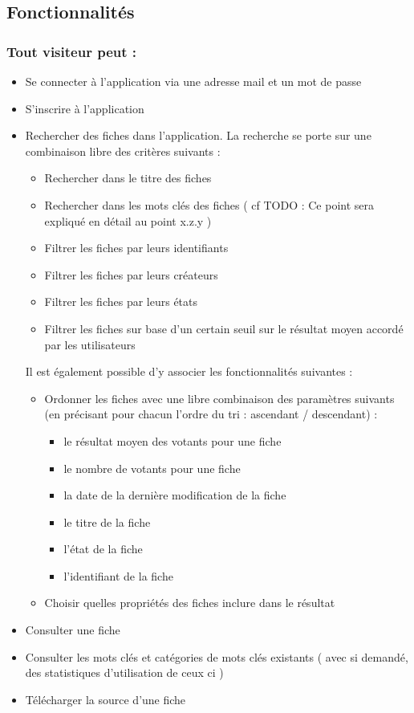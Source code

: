 \pagebreak

\subsection*{Fonctionnalités}

\subsubsection*{Tout visiteur peut : }

\begin{itemize}
    \item Se connecter à l'application via une adresse mail et un mot de passe
    \item S'inscrire à l'application
    \item Rechercher des fiches dans l'application. La recherche se porte sur une combinaison libre des critères suivants : 
    \begin{itemize}
        \item Rechercher dans le titre des fiches
        \item Rechercher dans les mots clés des fiches ( cf TODO : Ce point sera expliqué en détail au point x.z.y )
        \item Filtrer les fiches par leurs identifiants
        \item Filtrer les fiches par leurs créateurs
        \item Filtrer les fiches par leurs états
        \item Filtrer les fiches sur base d'un certain seuil sur le résultat moyen accordé par les utilisateurs
    \end{itemize}
    Il est également possible d'y associer les fonctionnalités suivantes :
    \begin{itemize}
        \item Ordonner les fiches avec une libre combinaison des paramètres suivants (en précisant pour chacun l'ordre du tri : ascendant / descendant) :
        \begin{itemize}
            \item le résultat moyen des votants pour une fiche
            \item le nombre de votants pour une fiche
            \item la date de la dernière modification de la fiche
            \item le titre de la fiche
            \item l'état de la fiche
            \item l'identifiant de la fiche
        \end{itemize}
        \item Choisir quelles propriétés des fiches inclure dans le résultat
    \end{itemize}
    \item Consulter une fiche
    \item Consulter les mots clés et catégories de mots clés existants ( avec si demandé, des statistiques d'utilisation de ceux ci )
    \item Télécharger la source d'une fiche 
\end{itemize}

